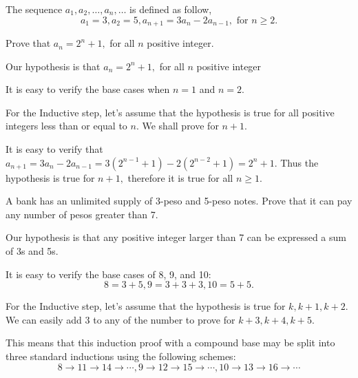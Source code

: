 \documentclass{article}
\begin{document}
\newpage

\begin{example}
    The sequence $a_1, a_2, \ldots, a_n, \ldots$ is defined as follow,
    \[
        a_1 = 3, a_2 = 5, a_{n+1} = 3a_n - 2a_{n-1}, \text{\ for\ } n \ge 2.
    \]

    Prove that $a_n = 2^n + 1,$ for all $n$ positive integer.
\end{example}

\begin{soln}
    Our hypothesis is that $a_n = 2^n + 1,$ for all $n$ positive integer

    It is easy to verify the base cases when $n=1$ and $n=2$.
    
    For the Inductive step, let's assume that the hypothesis is true for all positive integers less than or equal to $n.$
    We shall prove for $n+1.$

    It is easy to verify that $a_{n+1} = 3a_n - 2a_{n-1} = 3(2^{n-1}+1) - 2(2^{n-2}+1) = 2^{n} + 1.$
    Thus the hypothesis is true for $n+1,$ therefore it is true for all $n \ge 1.$
\end{soln}

\begin{example}
    A bank has an unlimited supply of 3-peso and 5-peso notes. Prove that it can pay any number of pesos greater than 7.
\end{example}

\begin{soln}
    Our hypothesis is that any positive integer larger than 7 can be expressed a sum of 3s and 5s.

    It is easy to verify the base cases of 8, 9, and 10:
    \[
        8 = 3 + 5, 9 = 3 + 3 + 3, 10 = 5 + 5.
    \]
    
    For the Inductive step, let's assume that the hypothesis is true for $k, k+1, k+2.$
    We can easily add 3 to any of the number to prove for $k+3, k+4, k+5.$

    This means that this induction proof with a compound base may be split into three standard inductions using the following schemes:
    \[
        8 \rightarrow 11 \rightarrow 14 \rightarrow \cdots,
        9 \rightarrow 12 \rightarrow 15 \rightarrow \cdots,
        10 \rightarrow 13 \rightarrow 16 \rightarrow \cdots
    \]
\end{soln}
\end{document}
